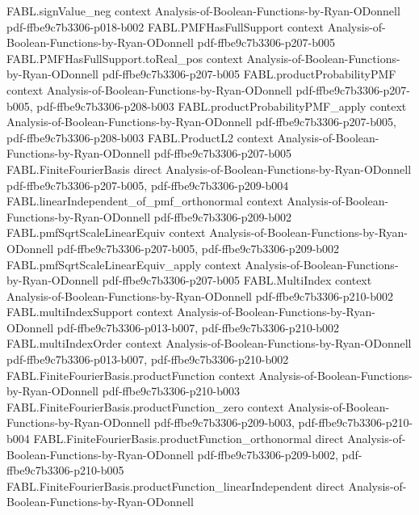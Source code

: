 \begin{theorem}
\proofstep
  {FABL.signValue_neg}
  {context}
  {Analysis-of-Boolean-Functions-by-Ryan-ODonnell}
  {pdf-ffbe9c7b3306-p018-b002}
\proofstep
  {FABL.PMFHasFullSupport}
  {context}
  {Analysis-of-Boolean-Functions-by-Ryan-ODonnell}
  {pdf-ffbe9c7b3306-p207-b005}
\proofstep
  {FABL.PMFHasFullSupport.toReal_pos}
  {context}
  {Analysis-of-Boolean-Functions-by-Ryan-ODonnell}
  {pdf-ffbe9c7b3306-p207-b005}
\proofstep
  {FABL.productProbabilityPMF}
  {context}
  {Analysis-of-Boolean-Functions-by-Ryan-ODonnell}
  {pdf-ffbe9c7b3306-p207-b005,
    pdf-ffbe9c7b3306-p208-b003}
\proofstep
  {FABL.productProbabilityPMF_apply}
  {context}
  {Analysis-of-Boolean-Functions-by-Ryan-ODonnell}
  {pdf-ffbe9c7b3306-p207-b005,
    pdf-ffbe9c7b3306-p208-b003}
\proofstep
  {FABL.ProductL2}
  {context}
  {Analysis-of-Boolean-Functions-by-Ryan-ODonnell}
  {pdf-ffbe9c7b3306-p207-b005}
\proofstep
  {FABL.FiniteFourierBasis}
  {direct}
  {Analysis-of-Boolean-Functions-by-Ryan-ODonnell}
  {pdf-ffbe9c7b3306-p207-b005,
    pdf-ffbe9c7b3306-p209-b004}
\proofstep
  {FABL.linearIndependent_of_pmf_orthonormal}
  {context}
  {Analysis-of-Boolean-Functions-by-Ryan-ODonnell}
  {pdf-ffbe9c7b3306-p209-b002}
\proofstep
  {FABL.pmfSqrtScaleLinearEquiv}
  {context}
  {Analysis-of-Boolean-Functions-by-Ryan-ODonnell}
  {pdf-ffbe9c7b3306-p207-b005,
    pdf-ffbe9c7b3306-p209-b002}
\proofstep
  {FABL.pmfSqrtScaleLinearEquiv_apply}
  {context}
  {Analysis-of-Boolean-Functions-by-Ryan-ODonnell}
  {pdf-ffbe9c7b3306-p207-b005}
\proofstep
  {FABL.MultiIndex}
  {context}
  {Analysis-of-Boolean-Functions-by-Ryan-ODonnell}
  {pdf-ffbe9c7b3306-p210-b002}
\proofstep
  {FABL.multiIndexSupport}
  {context}
  {Analysis-of-Boolean-Functions-by-Ryan-ODonnell}
  {pdf-ffbe9c7b3306-p013-b007,
    pdf-ffbe9c7b3306-p210-b002}
\proofstep
  {FABL.multiIndexOrder}
  {context}
  {Analysis-of-Boolean-Functions-by-Ryan-ODonnell}
  {pdf-ffbe9c7b3306-p013-b007,
    pdf-ffbe9c7b3306-p210-b002}
\proofstep
  {FABL.FiniteFourierBasis.productFunction}
  {context}
  {Analysis-of-Boolean-Functions-by-Ryan-ODonnell}
  {pdf-ffbe9c7b3306-p210-b003}
\proofstep
  {FABL.FiniteFourierBasis.productFunction_zero}
  {context}
  {Analysis-of-Boolean-Functions-by-Ryan-ODonnell}
  {pdf-ffbe9c7b3306-p209-b003,
    pdf-ffbe9c7b3306-p210-b004}
\proofstep
  {FABL.FiniteFourierBasis.productFunction_orthonormal}
  {direct}
  {Analysis-of-Boolean-Functions-by-Ryan-ODonnell}
  {pdf-ffbe9c7b3306-p209-b002,
    pdf-ffbe9c7b3306-p210-b005}
\proofstep
  {FABL.FiniteFourierBasis.productFunction_linearIndependent}
  {direct}
  {Analysis-of-Boolean-Functions-by-Ryan-ODonnell}

\end{theorem}
